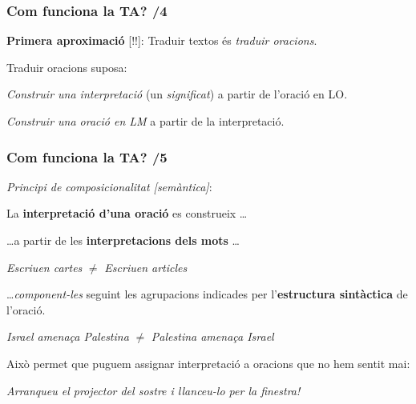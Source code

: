 \documentclass{beamer}
\newcommand{\empha}[1]{\emph{#1}\/}
\begin{document}
\begin{frame}
\frametitle{ Com funciona la TA? /4}

\textbf{Primera aproximació} [!!]: Traduir textos és
\empha{traduir oracions}.

Traduir oracions suposa:

{
\begin{itemize}
  {\item \empha{Construir una interpretació} (un
    \empha{significat}) a partir de l'oració en LO.}  {\item
  \empha{Construir una oració en LM} a partir de la interpretació.}
\end{itemize}
}
\end{frame}

\begin{frame}
\frametitle{ Com funciona la TA? /5}

\empha{Principi de composicionalitat [semàntica]}:


{
{La \textbf{interpretació d'una oració} es construeix \ldots}

\pause

{\ldots a partir de les \textbf{interpretacions dels
    mots} \ldots}

\pause
{\begin{center}\textit{Escriuen \empha{cartes}} $\neq$ \textit{Escriuen \empha{articles}}\end{center}}

\pause
{\ldots \empha{component-les} seguint les agrupacions indicades 
per l'\textbf{estructura sintàctica} de
  l'oració.}
\pause
{\begin{center} \textit{Israel amenaça Palestina} $\neq$ \textit{Palestina amenaça Israel} \end{center}}
\pause
Això permet que puguem assignar interpretació a oracions que no hem sentit mai:

\pause
{\begin{center} \textit{Arranqueu el projector del sostre i llanceu-lo per la finestra!} \end{center}}

}

\end{frame}

\end{document}

